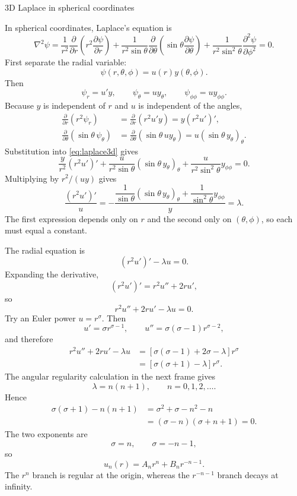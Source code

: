 \documentclass[11pt]{beamer}
\begin{document}
\begin{frame}[allowframebreaks]{3D Laplace in spherical coordinates}
\footnotesize

In spherical coordinates, Laplace's equation is
\begin{equation}
  \nabla^2\psi
  =
  \frac{1}{r^2}
    \frac{\partial}{\partial r}
      \left(r^2\frac{\partial\psi}{\partial r}\right)
  +\frac{1}{r^2\sin\theta}
    \frac{\partial}{\partial\theta}
      \left(\sin\theta\frac{\partial\psi}{\partial\theta}\right)
  +\frac{1}{r^2\sin^2\theta}
    \frac{\partial^2\psi}{\partial\phi^2}
  =0.
  \label{eq:laplace3d}
\end{equation}
First separate the radial variable:
\[
  \psi(r,\theta,\phi)=u(r)y(\theta,\phi).
\]
Then
\[
  \psi_r=u'y,
  \qquad
  \psi_\theta=uy_\theta,
  \qquad
  \psi_{\phi\phi}=uy_{\phi\phi}.
\]
Because $y$ is independent of $r$ and $u$ is independent of the angles,
\begin{align*}
  \frac{\partial}{\partial r}(r^2\psi_r)
    &=\frac{\partial}{\partial r}(r^2u'y)
      =y(r^2u')',\\
  \frac{\partial}{\partial\theta}(\sin\theta\,\psi_\theta)
    &=\frac{\partial}{\partial\theta}
      (\sin\theta\,u y_\theta)
      =u(\sin\theta\,y_\theta)_\theta.
\end{align*}
Substitution into \eqref{eq:laplace3d} gives
\[
  \frac{y}{r^2}(r^2u')'
  +\frac{u}{r^2\sin\theta}(\sin\theta\,y_\theta)_\theta
  +\frac{u}{r^2\sin^2\theta}y_{\phi\phi}=0.
\]
Multiplying by $r^2/(uy)$ gives
\begin{equation}
  \frac{(r^2u')'}{u}
  =
  -\frac{
      \dfrac{1}{\sin\theta}(\sin\theta\,y_\theta)_\theta
      +\dfrac{1}{\sin^2\theta}y_{\phi\phi}
    }{y}
  =\lambda.
  \label{eq:sep-radial3d}
\end{equation}
The first expression depends only on $r$ and the second only on
$(\theta,\phi)$, so each must equal a constant.

The radial equation is
\[
  (r^2u')'-\lambda u=0.
\]
Expanding the derivative,
\[
  (r^2u')'=r^2u''+2ru',
\]
so
\[
  r^2u''+2ru'-\lambda u=0.
\]
Try an Euler power $u=r^\sigma$.  Then
\[
  u'=\sigma r^{\sigma-1},
  \qquad
  u''=\sigma(\sigma-1)r^{\sigma-2},
\]
and therefore
\begin{align*}
  r^2u''+2ru'-\lambda u
   &=
    \left[
      \sigma(\sigma-1)+2\sigma-\lambda
    \right]r^\sigma\\
   &=
    \left[
      \sigma(\sigma+1)-\lambda
    \right]r^\sigma.
\end{align*}
The angular regularity calculation in the next frame gives
\[
  \lambda=n(n+1),
  \qquad n=0,1,2,\ldots.
\]
Hence
\begin{align*}
  \sigma(\sigma+1)-n(n+1)
   &=\sigma^2+\sigma-n^2-n\\
   &=(\sigma-n)(\sigma+n+1)=0.
\end{align*}
The two exponents are
\[
  \sigma=n,
  \qquad
  \sigma=-n-1,
\]
so
\begin{equation}
  u_n(r)=A_nr^n+B_nr^{-n-1}.
  \label{eq:spherical-radial-powers}
\end{equation}
The $r^n$ branch is regular at the origin, whereas the $r^{-n-1}$ branch
decays at infinity.


\end{frame}
\end{document}
